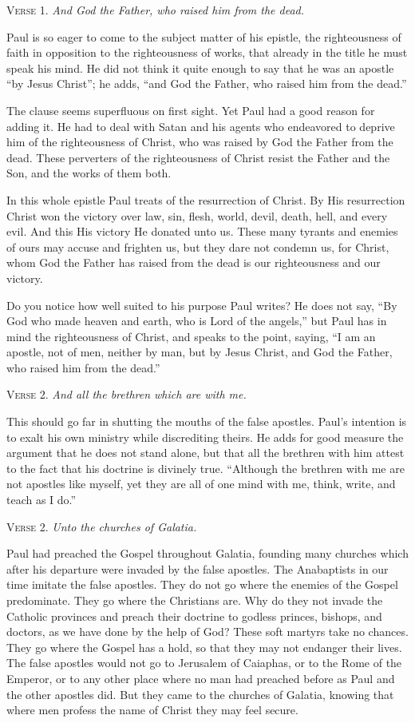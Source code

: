 \textsc{Verse} 1. \emph{And God the Father, who raised him from the dead.}

Paul is so eager to come to the subject matter of his epistle, the righteousness of faith in opposition to the righteousness of works, that already in the title he must speak his mind. He did not think it quite enough to say that he was an apostle “by Jesus Christ”; he adds, “and God the Father, who raised him from the dead.”

The clause seems superfluous on first sight. Yet Paul had a good reason for adding it. He had to deal with Satan and his agents who endeavored to deprive him of the righteousness of Christ, who was raised by God the Father from the dead. These perverters of the righteousness of Christ resist the Father and the Son, and the works of them both.

In this whole epistle Paul treats of the resurrection of Christ. By His resurrection Christ won the victory over law, sin, flesh, world, devil, death, hell, and every evil. And this His victory He donated unto us. These many tyrants and enemies of ours may accuse and frighten us, but they dare not condemn us, for Christ, whom God the Father has raised from the dead is our righteousness and our victory.

Do you notice how well suited to his purpose Paul writes? He does not say, “By God who made heaven and earth, who is Lord of the angels,” but Paul has in mind the righteousness of Christ, and speaks to the point, saying, “I am an apostle, not of men, neither by man, but by Jesus Christ, and God the Father, who raised him from the dead.”

\textsc{Verse} 2. \emph{And all the brethren which are with me.}

This should go far in shutting the mouths of the false apostles. Paul’s intention is to exalt his own ministry while discrediting theirs. He adds for good measure the argument that he does not stand alone, but that all the brethren with him attest to the fact that his doctrine is divinely true. “Although the brethren with me are not apostles like myself, yet they are all of one mind with me, think, write, and teach as I do.”

\textsc{Verse} 2. \emph{Unto the churches of Galatia.}

Paul had preached the Gospel throughout Galatia, founding many churches which after his departure were invaded by the false apostles. The Anabaptists in our time imitate the false apostles. They do not go where the enemies of the Gospel predominate. They go where the Christians are. Why do they not invade the Catholic provinces and preach their doctrine to godless princes, bishops, and doctors, as we have done by the help of God? These soft martyrs take no chances. They go where the Gospel has a hold, so that they may not endanger their lives. The false apostles would not go to Jerusalem of Caiaphas, or to the Rome of the Emperor, or to any other place where no man had preached before as Paul and the other apostles did. But they came to the churches of Galatia, knowing that where men profess the name of Christ they may feel secure.

